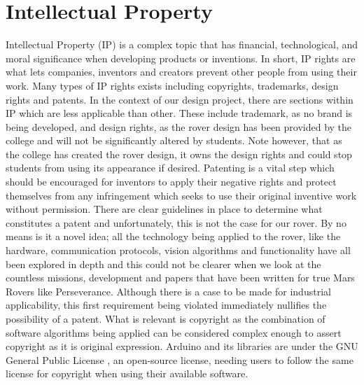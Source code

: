 \documentclass[a4paper]{article}
\begin{document}
\section{Intellectual Property}
Intellectual Property (IP) is a complex topic that has financial, technological, 
and moral significance when developing products or inventions. In short, IP rights are what
lets companies, inventors and creators prevent other people from using their work\cite{perea}.
Many types of IP rights exists including copyrights, trademarks, design rights and patents.  
In the context of our design project, there are sections within IP which are less applicable than other. 
These include trademark, as no brand is being developed, and design rights, as the rover design has
been provided by the college and will not be significantly altered by students. Note however,
that as the college has created the rover design, it owns the design rights and could stop students
from using its appearance if desired. Patenting 
is a vital step which should be encouraged for inventors to apply their negative rights and 
protect themselves from any infringement which seeks to use their original inventive work without permission. 
There are clear guidelines in place to determine what constitutes a patent and unfortunately, 
this is not the case for our rover. By no means is it a novel idea; all the technology being 
applied to the rover, like the hardware, communication protocols, vision algorithms and functionality 
have all been explored in depth and this could not be clearer when we look at the countless missions, 
development and papers that have been written for true Mars Rovers like Perseverance. 
Although there is a case to be made for industrial applicability, this first requirement being 
violated immediately nullifies the possibility of a patent. What is relevant is copyright as 
the combination of software algorithms being applied can be considered complex enough to assert 
copyright as it is original expression. Arduino and its libraries are under the GNU General 
Public License \cite{ArduinoLicense}, an open-source license, needing users to follow the same license for copyright 
when using their available software.
\end{document}
